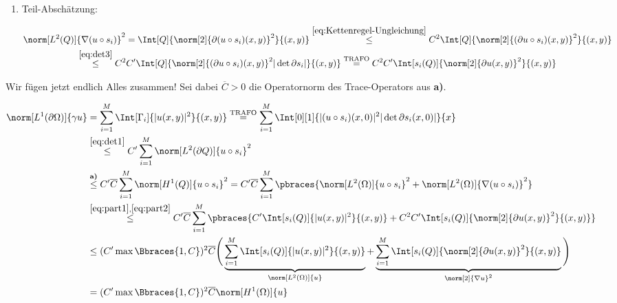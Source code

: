 \begin{solution}
\begin{enumerate}[label = \textbf{\alph*)}]
\begin{enumerate}[label = \arabic*.]
\begin{enumerate}[label = \arabic*.]
      \item Teil-Abschätzung:
      
      \begin{multline}
        \label{eq:part2}
        \norm[L^2(Q)]{\nabla (u \circ s_i)}^2
        =
        \Int[Q]{\norm[2]{\partial (u \circ s_i)(x, y)}^2}{(x, y)}
        \stackrel
        {
          \eqref{eq:Kettenregel-Ungleichung}
        }{\leq}
        C^2 \Int[Q]{\norm[2]{(\partial u \circ s_i)(x, y)}^2}{(x, y)} \\
        \stackrel
        {
          \eqref{eq:det3}
        }{\leq}
        C^2 C^\prime \Int[Q]{\norm[2]{(\partial u \circ s_i)(x, y)}^2 |\det \partial s_i|}{(x, y)}
        \stackrel
        {
          \text{TRAFO}
        }{=}
        C^2 C^\prime \Int[s_i(Q)]{\norm[2]{\partial u(x, y)}^2}{(x, y)}
      \end{multline}

    \end{enumerate}

    Wir fügen jetzt endlich Alles zusammen!
    Sei dabei $\overline{C} > 0$ die Operatornorm des Trace-Operators aus \textbf{a)}.

    \begin{align*}
      \norm[L^1(\partial \Omega)]{\gamma u}
      & =
      \sum_{i=1}^M
      \Int[\Gamma_i]{|u(x, y)|^2}{(x, y)}
      \stackrel
      {
        \text{TRAFO}
      }{=}
      \sum_{i=1}^M
      \Int[0][1]{|(u \circ s_i)(x, 0)|^2 |\det \partial s_i(x, 0)|}{x} \\
      & \stackrel{\eqref{eq:det1}}{\leq}
      C^\prime
      \sum_{i=1}^M
      \norm[L^2(\partial Q)]{u \circ s_i}^2 \\
      & \stackrel
      {
        \textbf{a)}
      }{\leq}
      C^\prime
      \overline{C}
      \sum_{i=1}^M
      \norm[H^1(Q)]{u \circ s_i}^2
      =
      C^\prime
      \overline{C}
      \sum_{i=1}^M
      \pbraces
      {
        \norm[L^2(\Omega)]{u \circ s_i}^2
        +
        \norm[L^2(\Omega)]{\nabla (u \circ s_i)}^2
      } \\
      & \stackrel
      {
        \eqref{eq:part1},
        \eqref{eq:part2}
      }{\leq}
      C^\prime
      \overline{C}
      \sum_{i=1}^M
      \pbraces
      {
        C^\prime
        \Int[s_i(Q)]{|u(x, y)|^2}{(x, y)}
        +
        C^2 C^\prime
        \Int[s_i(Q)]{\norm[2]{\partial u(x, y)}^2}{(x, y)}
      } \\
      & \leq
      (
        C^\prime
        \max \Bbraces{1, C}
      )^2
      \overline{C}
      \Bigg (
        \underbrace
        {
          \sum_{i=1}^M
          \Int[s_i(Q)]{|u(x, y)|^2}{(x, y)}
        }_{
          \norm[L^2(\Omega)]{u}
        }
        +
        \underbrace
        {
          \sum_{i=1}^M
          \Int[s_i(Q)]{\norm[2]{\partial u(x, y)}^2}{(x, y)}
        }_{
          \norm[2]{\nabla u}^2
        }
      \Bigg ) \\
      & =
      (
        C^\prime
        \max \Bbraces{1, C}
      )^2
      \overline{C}
      \norm[H^1(\Omega)]{u}
    \end{align*}


\end{enumerate}
\end{enumerate}
\end{solution}
